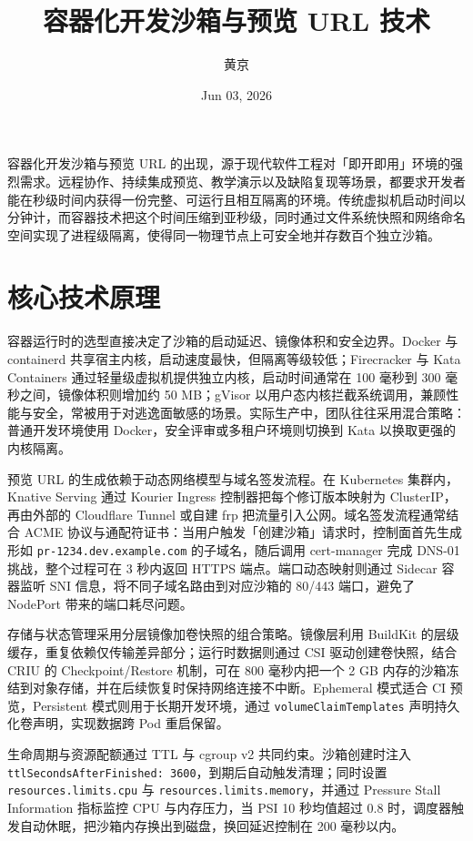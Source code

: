 \title{容器化开发沙箱与预览 URL 技术}
\author{黄京}
\date{Jun 03, 2026}
\maketitle
容器化开发沙箱与预览 URL 的出现，源于现代软件工程对「即开即用」环境的强烈需求。远程协作、持续集成预览、教学演示以及缺陷复现等场景，都要求开发者能在秒级时间内获得一份完整、可运行且相互隔离的环境。传统虚拟机启动时间以分钟计，而容器技术把这个时间压缩到亚秒级，同时通过文件系统快照和网络命名空间实现了进程级隔离，使得同一物理节点上可安全地并存数百个独立沙箱。\par
\chapter{核心技术原理}
容器运行时的选型直接决定了沙箱的启动延迟、镜像体积和安全边界。Docker 与 containerd 共享宿主内核，启动速度最快，但隔离等级较低；Firecracker 与 Kata Containers 通过轻量级虚拟机提供独立内核，启动时间通常在 100 毫秒到 300 毫秒之间，镜像体积则增加约 50 MB；gVisor 以用户态内核拦截系统调用，兼顾性能与安全，常被用于对逃逸面敏感的场景。实际生产中，团队往往采用混合策略：普通开发环境使用 Docker，安全评审或多租户环境则切换到 Kata 以换取更强的内核隔离。\par
预览 URL 的生成依赖于动态网络模型与域名签发流程。在 Kubernetes 集群内，Knative Serving 通过 Kourier Ingress 控制器把每个修订版本映射为 ClusterIP，再由外部的 Cloudflare Tunnel 或自建 frp 把流量引入公网。域名签发流程通常结合 ACME 协议与通配符证书：当用户触发「创建沙箱」请求时，控制面首先生成形如 \texttt{pr-1234.dev.example.com} 的子域名，随后调用 cert-manager 完成 DNS-01 挑战，整个过程可在 3 秒内返回 HTTPS 端点。端口动态映射则通过 Sidecar 容器监听 SNI 信息，将不同子域名路由到对应沙箱的 80/443 端口，避免了 NodePort 带来的端口耗尽问题。\par
存储与状态管理采用分层镜像加卷快照的组合策略。镜像层利用 BuildKit 的层级缓存，重复依赖仅传输差异部分；运行时数据则通过 CSI 驱动创建卷快照，结合 CRIU 的 Checkpoint/Restore 机制，可在 800 毫秒内把一个 2 GB 内存的沙箱冻结到对象存储，并在后续恢复时保持网络连接不中断。Ephemeral 模式适合 CI 预览，Persistent 模式则用于长期开发环境，通过 \texttt{volumeClaimTemplates} 声明持久化卷声明，实现数据跨 Pod 重启保留。\par
生命周期与资源配额通过 TTL 与 cgroup v2 共同约束。沙箱创建时注入 \texttt{ttlSecondsAfterFinished: 3600}，到期后自动触发清理；同时设置 \texttt{resources.limits.cpu} 与 \texttt{resources.limits.memory}，并通过 Pressure Stall Information 指标监控 CPU 与内存压力，当 PSI 10 秒均值超过 0.8 时，调度器触发自动休眠，把沙箱内存换出到磁盘，换回延迟控制在 200 毫秒以内。\par
